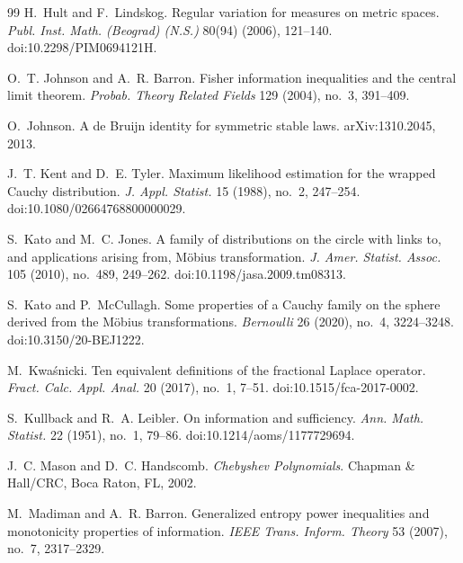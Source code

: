 \begin{thebibliography}{99}
H.~Hult and F.~Lindskog.
\newblock Regular variation for measures on metric spaces.
\newblock \emph{Publ. Inst. Math. (Beograd) (N.S.)} 80(94) (2006), 121--140.
\newblock doi:10.2298/PIM0694121H.

O.~T. Johnson and A.~R. Barron.
\newblock Fisher information inequalities and the central limit theorem.
\newblock \emph{Probab. Theory Related Fields} 129 (2004), no.~3, 391--409.

O.~Johnson.
\newblock A de Bruijn identity for symmetric stable laws.
\newblock arXiv:1310.2045, 2013.

J.~T. Kent and D.~E. Tyler.
\newblock Maximum likelihood estimation for the wrapped Cauchy distribution.
\newblock \emph{J. Appl. Statist.} 15 (1988), no.~2, 247--254.
\newblock doi:10.1080/02664768800000029.

S.~Kato and M.~C. Jones.
\newblock A family of distributions on the circle with links to, and
applications arising from, M{\"o}bius transformation.
\newblock \emph{J. Amer. Statist. Assoc.} 105 (2010), no.~489, 249--262.
\newblock doi:10.1198/jasa.2009.tm08313.

S.~Kato and P.~McCullagh.
\newblock Some properties of a Cauchy family on the sphere derived from the
M{\"o}bius transformations.
\newblock \emph{Bernoulli} 26 (2020), no.~4, 3224--3248.
\newblock doi:10.3150/20-BEJ1222.

M.~Kwa{\'s}nicki.
\newblock Ten equivalent definitions of the fractional Laplace operator.
\newblock \emph{Fract. Calc. Appl. Anal.} 20 (2017), no.~1, 7--51.
\newblock doi:10.1515/fca-2017-0002.

S.~Kullback and R.~A. Leibler.
\newblock On information and sufficiency.
\newblock \emph{Ann. Math. Statist.} 22 (1951), no.~1, 79--86.
\newblock doi:10.1214/aoms/1177729694.

J.~C. Mason and D.~C. Handscomb.
\newblock \emph{Chebyshev Polynomials}.
\newblock Chapman \& Hall/CRC, Boca Raton, FL, 2002.

M.~Madiman and A.~R. Barron.
\newblock Generalized entropy power inequalities and monotonicity properties
of information.
\newblock \emph{IEEE Trans. Inform. Theory} 53 (2007), no.~7, 2317--2329.


\end{thebibliography}
